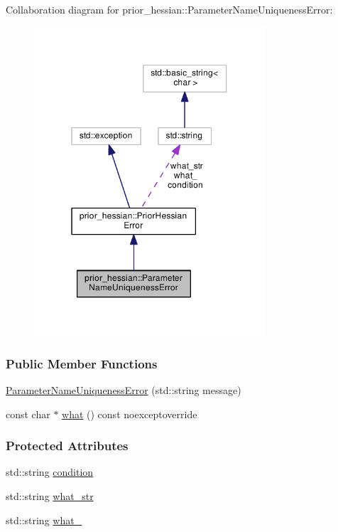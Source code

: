 Collaboration diagram for prior\+\_\+hessian\+:\+:Parameter\+Name\+Uniqueness\+Error\+:\nopagebreak
\begin{figure}[H]
\begin{center}
\leavevmode
\includegraphics[width=244pt]{structprior__hessian_1_1ParameterNameUniquenessError__coll__graph}
\end{center}
\end{figure}
\subsubsection*{Public Member Functions}
\begin{DoxyCompactItemize}
\item 
\hyperlink{structprior__hessian_1_1ParameterNameUniquenessError_afbfade2bd3151d335b09cbcf1b932d88}{Parameter\+Name\+Uniqueness\+Error} (std\+::string message)
\item 
const char $\ast$ \hyperlink{classprior__hessian_1_1PriorHessianError_a0d1812ff85f88f12c0fffd12f523263d}{what} () const noexceptoverride
\end{DoxyCompactItemize}
\subsubsection*{Protected Attributes}
\begin{DoxyCompactItemize}
\item 
std\+::string \hyperlink{classprior__hessian_1_1PriorHessianError_a0f00dbb23dc6ba9b3577503755b018c5}{condition}
\item 
std\+::string \hyperlink{classprior__hessian_1_1PriorHessianError_a0d97e1b6b1bcf6a440400706f416375e}{what\+\_\+str}
\item 
std\+::string \hyperlink{classprior__hessian_1_1PriorHessianError_a018e11b5863c2a3a06d37a16a89b14b2}{what\+\_\+}
\end{DoxyCompactItemize}


